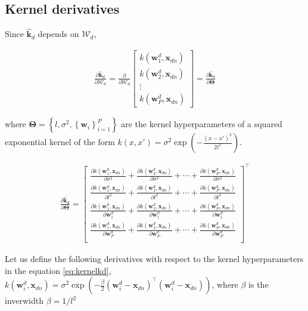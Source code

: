 \documentclass[]{article}
\newcommand{\dWj}{\partial\projMat}
\newcommand{\kernelwx}[1]{k\left(\mathbf{w}_{#1}^d,\indobj\right)}
\newcommand{\indobj}{\mathbf{x}_{dn}}
\newcommand{\projMat}{\boldsymbol{\mathcal{W}}_d}
\newcommand{\wIj}[1]{\mathbf{w}_{#1}^d}
\newcommand{\kawx}{\mathbf{\hat{k}}_d }
\newcommand{\dWd}{\partial \boldsymbol{\Theta}}
\begin{document}
\subsection{Kernel derivatives}




Since $\kawx$ depends on $\projMat$,

\begin{align}
\frac{\partial \kawx}{\dWj} = \frac{\partial }{\dWj} \left[ \begin{matrix}
 \kernelwx{1}\\
 \kernelwx{2}\\
 \vdots\\
 \kernelwx{P} 
 \end{matrix}\right]  = \frac{\partial \kawx}{\dWd}
\end{align}

where $\boldsymbol{\Theta}=\left\{l,\sigma^2,\left\{\mathbf{w}_i\right\}_{i=1}^{P}\right\}$ are the kernel hyperparameters of a squared exponential kernel of the form $k\left(x,x'\right)=\sigma^2\exp\left(-\frac{\left(x-x'\right)^2}{2l^2}\right)$.

\begin{align}
 \frac{\partial \kawx}{\dWd} = \left[ \begin{matrix}
  \frac{\partial \kernelwx{1}}{\partial \sigma^2} +  \frac{\partial \kernelwx{2}}{\partial \sigma^2} + \cdots + \frac{\partial \kernelwx{P}}{\partial \sigma^2} \\
   \frac{\partial \kernelwx{1}}{\partial l^2} +  \frac{\partial \kernelwx{2}}{\partial l^2} + \cdots + \frac{\partial \kernelwx{P}}{\partial l^2} \\
   \frac{\partial \kernelwx{1}}{\partial \wIj{1}} + \frac{\partial \kernelwx{2}}{\partial \wIj{1}}  + \cdots+ \frac{\partial \kernelwx{P}}{\partial \wIj{1}} \\
   \frac{\partial \kernelwx{1}}{\partial \wIj{P}} + \frac{\partial \kernelwx{2}}{\partial \wIj{P}}+\cdots+\frac{\partial \kernelwx{P}}{\partial \wIj{P}}\\
  \end{matrix}\right] ^\top
  \label{eq:kernelkd}
\end{align}

Let us define the following derivatives with respect to the kernel hyperparameters in the equation \eqref{eq:kernelkd}, $\kernelwx{i}=\sigma^2\exp\left(-\frac{\beta}{2}\left(\mathbf{w}_i^d-\mathbf{x}_{dn}\right)^\top\left(\mathbf{w}_i^d-\mathbf{x}_{dn}\right)\right)$, where $\beta$ is the inverwidth $\beta = 1/l^2$
\end{document}
